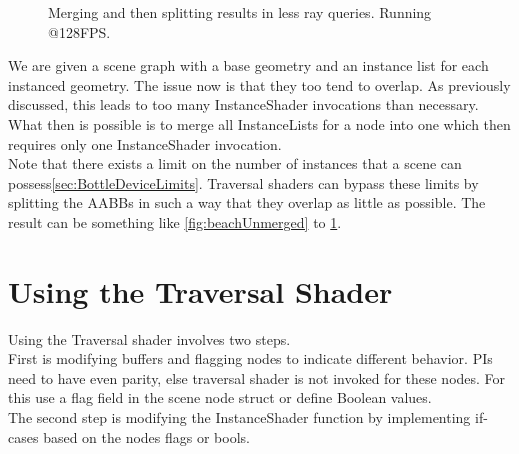 \begin{figure}
    \hfill
    \hfill
    \hfill
    \caption{Merging and then splitting results in less ray queries. Running @128FPS.}
    \label{fig:beachMerged}
\end{figure}
We are given a scene graph with a base geometry and an instance list for each instanced geometry. The issue now is that they too tend to overlap. As previously discussed, this leads to too many InstanceShader invocations than necessary. What then is possible is to merge all InstanceLists for a node into one which then requires only one InstanceShader invocation.\\
Note that there exists a limit on the number of instances that a scene can possess\ref{sec:BottleDeviceLimits}. Traversal shaders can bypass these limits by splitting the AABBs in such a way that they overlap as little as possible. The result can be something like \ref{fig:beachUnmerged} to \ref{fig:beachMerged}.
\newpage
\section{Using the Traversal Shader}
\label{sec:Usage}
Using the Traversal shader involves two steps. \\
First is modifying buffers and flagging nodes to indicate different behavior. PIs need to have even parity, else traversal shader is not invoked for these nodes. For this use a flag field in the scene node struct or define Boolean values.\\
The second step is modifying the InstanceShader function by implementing if-cases based on the nodes flags or bools.
